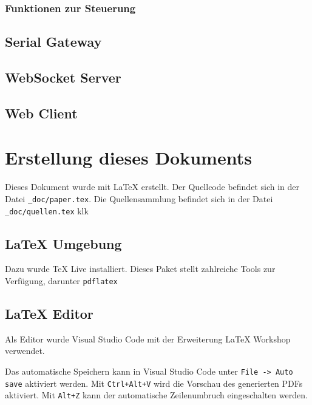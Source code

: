 \subsubsection{Funktionen zur Steuerung}


\newpage
\subsection{Serial Gateway}


\newpage
\subsection{WebSocket Server}


\newpage
\subsection{Web Client}


\newpage
\section{Erstellung dieses Dokuments}
Dieses Dokument wurde mit LaTeX erstellt. Der Quellcode befindet sich in der Datei
\verb|_doc/paper.tex|. Die Quellensammlung befindet sich in der Datei \verb|_doc/quellen.tex| klk

\subsection{LaTeX Umgebung}
Dazu wurde TeX Live \cite{texlive} installiert. Dieses
Paket stellt zahlreiche Tools zur Verfügung, darunter  \verb|pdflatex|

\subsection{LaTeX Editor}
Als Editor wurde Visual Studio Code \cite{vscode} mit der Erweiterung LaTeX Workshop \cite{latexWorkshop} verwendet.

Das automatische Speichern kann in Visual Studio Code unter \verb|File -> Auto save| aktiviert werden. Mit \verb|Ctrl+Alt+V| wird die Vorschau des generierten PDFs aktiviert. Mit \verb|Alt+Z| kann der automatische Zeilenumbruch eingeschalten werden.

